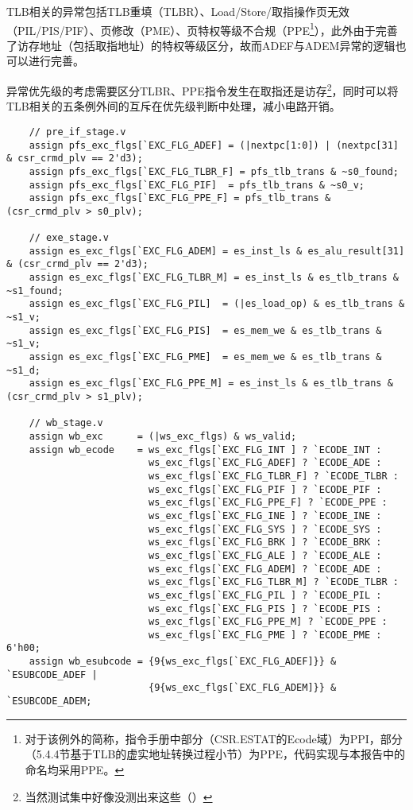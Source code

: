 \documentclass[UTF-8,twoside,c5size]{ctexart}
\begin{document}
    TLB相关的异常包括TLB重填（TLBR）、Load/Store/取指操作页无效（PIL/PIS/PIF）、页修改（PME）、页特权等级不合规（PPE\footnote{对于该例外的简称，指令手册中部分（CSR.ESTAT的Ecode域）为PPI，部分（5.4.4节基于TLB的虚实地址转换过程小节）为PPE，代码实现与本报告中的命名均采用PPE。}），此外由于完善了访存地址（包括取指地址）的特权等级区分，故而ADEF与ADEM异常的逻辑也可以进行完善。
    
    异常优先级的考虑需要区分TLBR、PPE指令发生在取指还是访存\footnote{当然测试集中好像没测出来这些（）}，同时可以将TLB相关的五条例外间的互斥在优先级判断中处理，减小电路开销。
    
    \begin{verbatim}
    // pre_if_stage.v
    assign pfs_exc_flgs[`EXC_FLG_ADEF] = (|nextpc[1:0]) | (nextpc[31] & csr_crmd_plv == 2'd3);
    assign pfs_exc_flgs[`EXC_FLG_TLBR_F] = pfs_tlb_trans & ~s0_found;
    assign pfs_exc_flgs[`EXC_FLG_PIF]  = pfs_tlb_trans & ~s0_v;
    assign pfs_exc_flgs[`EXC_FLG_PPE_F] = pfs_tlb_trans & (csr_crmd_plv > s0_plv);

    // exe_stage.v
    assign es_exc_flgs[`EXC_FLG_ADEM] = es_inst_ls & es_alu_result[31] & (csr_crmd_plv == 2'd3);
    assign es_exc_flgs[`EXC_FLG_TLBR_M] = es_inst_ls & es_tlb_trans & ~s1_found;
    assign es_exc_flgs[`EXC_FLG_PIL]  = (|es_load_op) & es_tlb_trans & ~s1_v;
    assign es_exc_flgs[`EXC_FLG_PIS]  = es_mem_we & es_tlb_trans & ~s1_v;
    assign es_exc_flgs[`EXC_FLG_PME]  = es_mem_we & es_tlb_trans & ~s1_d;
    assign es_exc_flgs[`EXC_FLG_PPE_M] = es_inst_ls & es_tlb_trans & (csr_crmd_plv > s1_plv);
    
    // wb_stage.v
    assign wb_exc      = (|ws_exc_flgs) & ws_valid;
    assign wb_ecode    = ws_exc_flgs[`EXC_FLG_INT ] ? `ECODE_INT :
                         ws_exc_flgs[`EXC_FLG_ADEF] ? `ECODE_ADE :
                         ws_exc_flgs[`EXC_FLG_TLBR_F] ? `ECODE_TLBR :
                         ws_exc_flgs[`EXC_FLG_PIF ] ? `ECODE_PIF :
                         ws_exc_flgs[`EXC_FLG_PPE_F] ? `ECODE_PPE :
                         ws_exc_flgs[`EXC_FLG_INE ] ? `ECODE_INE :
                         ws_exc_flgs[`EXC_FLG_SYS ] ? `ECODE_SYS :
                         ws_exc_flgs[`EXC_FLG_BRK ] ? `ECODE_BRK :
                         ws_exc_flgs[`EXC_FLG_ALE ] ? `ECODE_ALE :
                         ws_exc_flgs[`EXC_FLG_ADEM] ? `ECODE_ADE :
                         ws_exc_flgs[`EXC_FLG_TLBR_M] ? `ECODE_TLBR :
                         ws_exc_flgs[`EXC_FLG_PIL ] ? `ECODE_PIL :
                         ws_exc_flgs[`EXC_FLG_PIS ] ? `ECODE_PIS :
                         ws_exc_flgs[`EXC_FLG_PPE_M] ? `ECODE_PPE :
                         ws_exc_flgs[`EXC_FLG_PME ] ? `ECODE_PME : 6'h00;
    assign wb_esubcode = {9{ws_exc_flgs[`EXC_FLG_ADEF]}} & `ESUBCODE_ADEF |
                         {9{ws_exc_flgs[`EXC_FLG_ADEM]}} & `ESUBCODE_ADEM;
    \end{verbatim}
\end{document}
